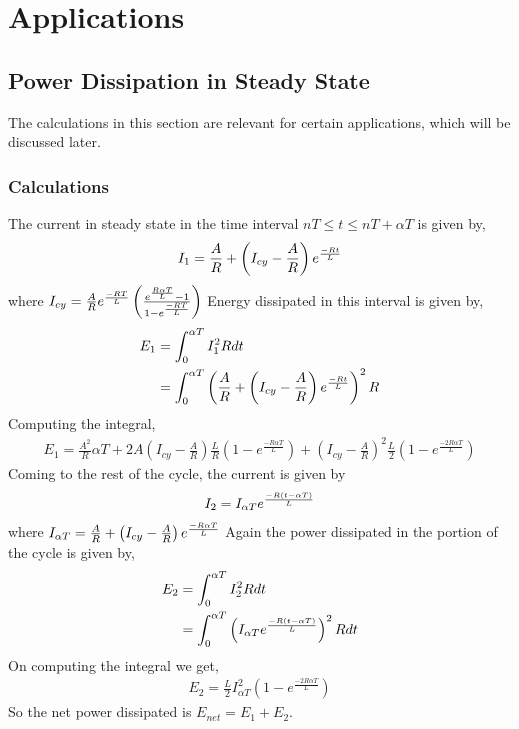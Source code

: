 
\chapter{Applications}

\label{Chapter7} %

\section{Power Dissipation in Steady State}
    The calculations in this section are relevant for certain applications, which will be discussed later.
\subsection{Calculations}
    The current in steady state in the time interval $nT \le t \le nT + \alpha T$ is given by, 
    \begin{align*}
               I_{1} = \frac{A}{R} + \left(I_{cy} - \frac{A}{R}\right)e^{\frac{-Rt}{L}}
    \end{align*}
    where $I_{cy} =\frac{A}{R}e^{\frac{-RT}{L}}\left(\frac{e^{\frac{R\alpha T}{L}} - 1}{1-e^{\frac{-RT}{L}}}\right)
 $
    Energy dissipated in this interval is given by, 
    \begin{align*}
        E_1 &= \int_{0}^{\alpha T} I_1^2R dt\\
        &= \int_0^{\alpha T}\left(\frac{A}{R} + \left(I_{cy} - \frac{A}{R}\right)e^{\frac{-Rt}{L}}\right)^2 R\\
    \end{align*}
    Computing the integral, 
    \begin{align*}
        E_1 = \frac{A^2}{R} \alpha T + 2A \left(I_{cy} - \frac{A}{R}\right) \frac{L}{R} \left(1 - e^{\frac{-R\alpha T}{L}}\right) + \left(I_{cy} - \frac{A}{R}\right)^2 \frac{L}{2} \left(1 - e^{\frac{-2R\alpha T}{L}}\right)
    \end{align*}
    Coming to the rest of the cycle, the current is given by
    \begin{align*}
        I_{2} = I_{\alpha T}e^{\frac{-R\left(t-\alpha T\right)}{L}}\\
    \end{align*}
    where $I_{\alpha T} =  \frac{A}{R} + \left(I_{cy} - \frac{A}{R}\right)e^{\frac{-R\alpha T}{L}}
 $
 Again the power dissipated in the portion of the cycle is given by, 
 \begin{align*}
    E_2 &= \int_{0}^{\alpha T} I_2^2R dt\\
    &= \int_{0}^{\alpha T} \left(I_{\alpha T}e^{\frac{-R\left(t-\alpha T\right)}{L}}\right)^2R dt\\
 \end{align*}
 On computing the integral we get, 
 \begin{align*}
     E_2 = \frac{L}{2} I_{\alpha T}^2 \left(1 - e^{\frac{-2R\alpha T}{L}}\right)
 \end{align*}
 So the net power dissipated is $E_{net} = E_1 + E_2$.

